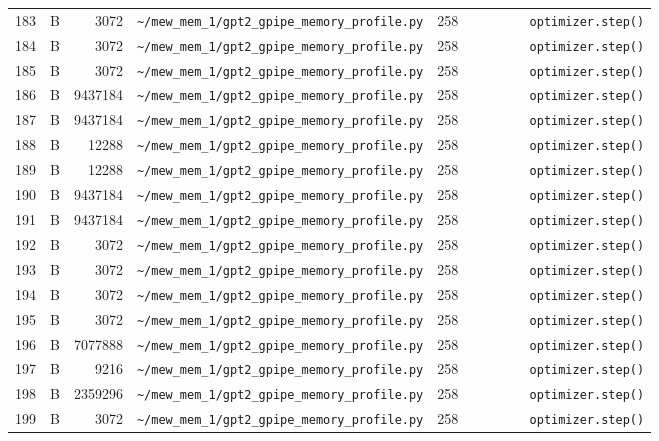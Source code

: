 \documentclass{article}
\begin{document}
\begin{longtable}{r l r p{6.5cm} r p{7.0cm}}
183 & B & 3072 & \lstinline|~/mew_mem_1/gpt2_gpipe_memory_profile.py| & 258 & \lstinline|        optimizer.step()| \\
184 & B & 3072 & \lstinline|~/mew_mem_1/gpt2_gpipe_memory_profile.py| & 258 & \lstinline|        optimizer.step()| \\
185 & B & 3072 & \lstinline|~/mew_mem_1/gpt2_gpipe_memory_profile.py| & 258 & \lstinline|        optimizer.step()| \\
186 & B & 9437184 & \lstinline|~/mew_mem_1/gpt2_gpipe_memory_profile.py| & 258 & \lstinline|        optimizer.step()| \\
187 & B & 9437184 & \lstinline|~/mew_mem_1/gpt2_gpipe_memory_profile.py| & 258 & \lstinline|        optimizer.step()| \\
188 & B & 12288 & \lstinline|~/mew_mem_1/gpt2_gpipe_memory_profile.py| & 258 & \lstinline|        optimizer.step()| \\
189 & B & 12288 & \lstinline|~/mew_mem_1/gpt2_gpipe_memory_profile.py| & 258 & \lstinline|        optimizer.step()| \\
190 & B & 9437184 & \lstinline|~/mew_mem_1/gpt2_gpipe_memory_profile.py| & 258 & \lstinline|        optimizer.step()| \\
191 & B & 9437184 & \lstinline|~/mew_mem_1/gpt2_gpipe_memory_profile.py| & 258 & \lstinline|        optimizer.step()| \\
192 & B & 3072 & \lstinline|~/mew_mem_1/gpt2_gpipe_memory_profile.py| & 258 & \lstinline|        optimizer.step()| \\
193 & B & 3072 & \lstinline|~/mew_mem_1/gpt2_gpipe_memory_profile.py| & 258 & \lstinline|        optimizer.step()| \\
194 & B & 3072 & \lstinline|~/mew_mem_1/gpt2_gpipe_memory_profile.py| & 258 & \lstinline|        optimizer.step()| \\
195 & B & 3072 & \lstinline|~/mew_mem_1/gpt2_gpipe_memory_profile.py| & 258 & \lstinline|        optimizer.step()| \\
196 & B & 7077888 & \lstinline|~/mew_mem_1/gpt2_gpipe_memory_profile.py| & 258 & \lstinline|        optimizer.step()| \\
197 & B & 9216 & \lstinline|~/mew_mem_1/gpt2_gpipe_memory_profile.py| & 258 & \lstinline|        optimizer.step()| \\
198 & B & 2359296 & \lstinline|~/mew_mem_1/gpt2_gpipe_memory_profile.py| & 258 & \lstinline|        optimizer.step()| \\
199 & B & 3072 & \lstinline|~/mew_mem_1/gpt2_gpipe_memory_profile.py| & 258 & \lstinline|        optimizer.step()| \\

\end{longtable}
\end{document}
